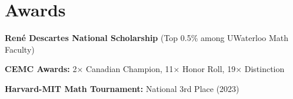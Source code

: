 \section{\color{ResumeColor}\textbf{Awards}}
    \resumeSubHeadingListStart

    \resumeItem
    {\textbf{René Descartes National Scholarship} (Top 0.5\% among UWaterloo Math Faculty)}

    \resumeItem
    {\textbf{CEMC Awards:} 2× Canadian Champion, 11× Honor Roll, 19× Distinction }

    
    \resumeItem
    {\textbf{Harvard-MIT Math Tournament:} National 3rd Place (2023)}
    \resumeSubHeadingListEnd